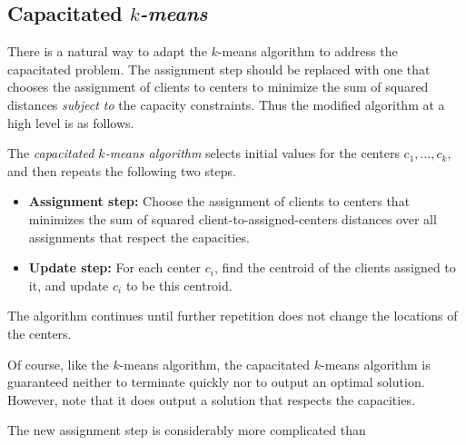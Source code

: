 \subsection{Capacitated {\em $k$-means}}

There is a natural way to adapt the $k$-means algorithm to address the
capacitated problem.  The assignment step should be replaced with one
that chooses the assignment of clients to centers to minimize the sum
of squared distances {\em subject to} the capacity constraints.  Thus
the modified algorithm at a high level is as follows.

The {\em capacitated $k$-means algorithm} selects initial values for
the centers $c_1, \ldots, c_k$, and then repeats the following two
steps.
\begin{itemize}
\item {\bf Assignment step:} Choose the assignment of clients to
  centers that minimizes the sum of squared client-to-assigned-centers
  distances over all assignments that respect the capacities.
\item {\bf Update step:} For each center $c_i$, find the centroid of
  the clients assigned to it, and update $c_i$ to be this centroid.
\end{itemize}
The algorithm continues until further repetition does not change the
locations of the centers.

Of course, like the $k$-means algorithm, the capacitated $k$-means
algorithm is guaranteed neither to terminate quickly nor to output an
optimal solution.  However, note that it does output a solution that
respects the capacities.  

The new assignment step is considerably more complicated than
